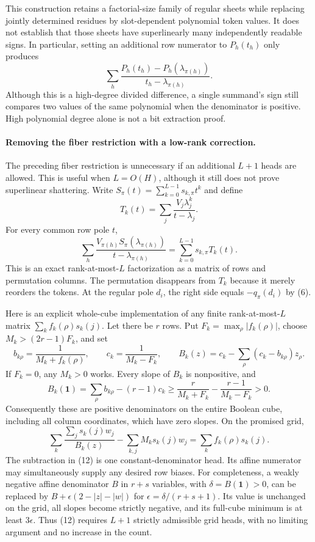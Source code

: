 \documentclass[11pt]{article}
\begin{document}
This construction retains a factorial-size family of regular sheets
while replacing jointly determined residues by slot-dependent
polynomial token values. It does not establish that those sheets have
superlinearly many independently readable signs. In particular,
setting an additional row numerator to $P_h(t_h)$ only produces
\[
 \sum_h\frac{P_h(t_h)-P_h(\lambda_{\pi(h)})}
                    {t_h-\lambda_{\pi(h)}}.
\]
Although this is a high-degree divided difference, a single summand's
sign still compares two values of the same polynomial when the
denominator is positive. High polynomial degree alone is not a bit
extraction proof.

\paragraph{Removing the fiber restriction with a low-rank correction.}
The preceding fiber restriction is unnecessary if an additional
$L+1$ heads are allowed. This is useful when $L=O(H)$, although it
still does not prove superlinear shattering. Write
$S_\pi(t)=\sum_{k=0}^{L-1}s_{k,\pi}t^k$ and define
\[
 T_k(t)=\sum_j\frac{V_j\lambda_j^k}{t-\lambda_j}.
\]
For every common row pole $t$,
\[
 \sum_h\frac{V_{\pi(h)}S_\pi(\lambda_{\pi(h)})}
                  {t-\lambda_{\pi(h)}}
       =\sum_{k=0}^{L-1}s_{k,\pi}T_k(t).
 \tag{11}
\]
This is an exact rank-at-most-$L$ factorization as a matrix of rows
and permutation columns. The permutation disappears from $T_k$
because it merely reorders the tokens. At the regular pole $d_i$,
the right side equals $-q_\pi(d_i)$ by (6).

Here is an explicit whole-cube implementation of any finite
rank-at-most-$L$ matrix $\sum_k f_k(\rho)s_k(j)$.
Let there be $r$ rows. Put $F_k=\max_\rho|f_k(\rho)|$, choose
$M_k>(2r-1)F_k$, and set
\[
 b_{k\rho}=\frac1{M_k+f_k(\rho)},\qquad
 c_k=\frac1{M_k-F_k},\qquad
 B_k(z)=c_k-\sum_\rho(c_k-b_{k\rho})z_\rho.
\]
If $F_k=0$, any $M_k>0$ works. Every slope of $B_k$ is nonpositive,
and
\[
 B_k(\boldsymbol1)=\sum_\rho b_{k\rho}-(r-1)c_k
 \geq\frac r{M_k+F_k}-\frac{r-1}{M_k-F_k}>0.
\]
Consequently these are positive denominators on the entire Boolean
cube, including all column coordinates, which have zero slopes.
On the promised grid,
\[
 \sum_k\frac{\sum_j s_k(j)w_j}{B_k(z)}
       -\sum_{k,j}M_ks_k(j)w_j
       =\sum_k f_k(\rho)s_k(j).
 \tag{12}
\]
The subtraction in (12) is one constant-denominator head. Its affine
numerator may simultaneously supply any desired row biases. For
completeness, a weakly negative affine denominator $B$ in $r+s$
variables, with $\delta=B(\boldsymbol1)>0$, can be replaced by
$B+\epsilon(2-|z|-|w|)$ for
$\epsilon=\delta/(r+s+1)$. Its value is unchanged on the grid,
all slopes become strictly negative, and its full-cube minimum is
at least $3\epsilon$. Thus (12) requires $L+1$ strictly admissible
grid heads, with no limiting argument and no increase in the count.
\end{document}
